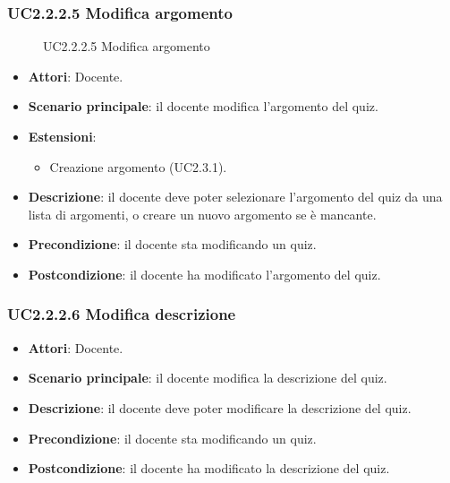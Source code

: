\subsubsection{UC2.2.2.5 Modifica argomento}
\begin{figure}[H]
\centering
\noindent{}
\caption{UC2.2.2.5 Modifica argomento}
\end{figure}
\begin{itemize}
\item \textbf{Attori}: Docente.
\item \textbf{Scenario principale}: il docente modifica l'argomento del quiz.
\item \textbf{Estensioni}:
\begin{itemize}
\item Creazione argomento (UC2.3.1).
\end{itemize}
\item \textbf{Descrizione}: il docente deve poter selezionare l'argomento del quiz da una lista di argomenti, o creare un nuovo argomento se è mancante.
\item \textbf{Precondizione}: il docente sta modificando un quiz.
\item \textbf{Postcondizione}: il docente ha modificato l'argomento del quiz.
\end{itemize}
\subsubsection{UC2.2.2.6 Modifica descrizione}
\begin{itemize}
\item \textbf{Attori}: Docente.
\item \textbf{Scenario principale}: il docente modifica la descrizione del quiz.
\item \textbf{Descrizione}: il docente deve poter modificare la descrizione del quiz.
\item \textbf{Precondizione}: il docente sta modificando un quiz.
\item \textbf{Postcondizione}: il docente ha modificato la descrizione del quiz.
\end{itemize}
